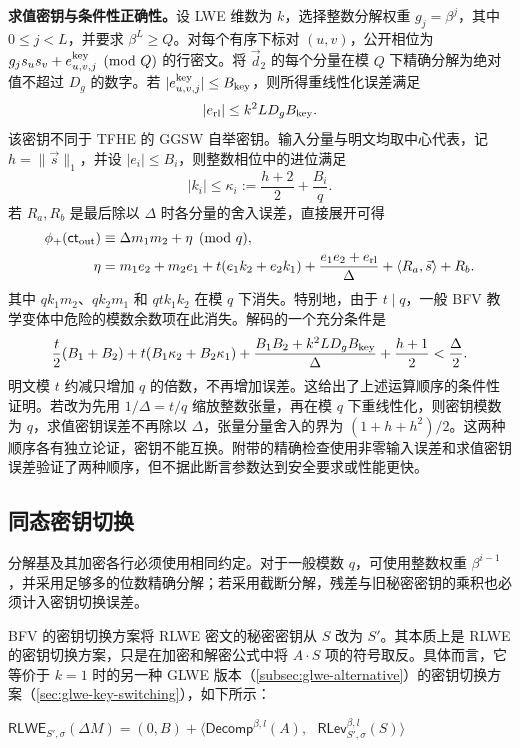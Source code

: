 \textbf{求值密钥与条件性正确性。}设 LWE 维数为 $k$，选择整数分解权重 $g_j=\beta^j$，其中 $0\leq j<L$，并要求 $\beta^L\geq Q$。对每个有序下标对 $(u,v)$，公开相位为 $g_js_us_v+e_{u,v,j}^{\rm key}\pmod Q$ 的行密文。将 $\vec d_2$ 的每个分量在模 $Q$ 下精确分解为绝对值不超过 $D_g$ 的数字。若 $|e_{u,v,j}^{\rm key}|\leq B_{\rm key}$，则所得重线性化误差满足
\[
|e_{\rm rl}|\leq k^2LD_gB_{\rm key}.
\]
该密钥不同于 TFHE 的 GGSW 自举密钥。输入分量与明文均取中心代表，记 $h=\|\vec s\|_1$，并设 $|e_i|\leq B_i$，则整数相位中的进位满足
\[
|k_i|\leq\kappa_i:=\frac{h+2}{2}+\frac{B_i}{q}.
\]
若 $R_a,R_b$ 是最后除以 $\Delta$ 时各分量的舍入误差，直接展开可得
\[
\begin{aligned}
\phi_+(\textsf{ct}_{\rm out})&\equiv\Delta m_1m_2+\eta\pmod q,\\
\eta&=m_1e_2+m_2e_1+t(e_1k_2+e_2k_1)
      +\frac{e_1e_2+e_{\rm rl}}\Delta
      +\langle R_a,\vec s\rangle+R_b.
\end{aligned}
\]
其中 $qk_1m_2$、$qk_2m_1$ 和 $qt k_1k_2$ 在模 $q$ 下消失。特别地，由于 $t\mid q$，一般 BFV 教学变体中危险的模数余数项在此消失。解码的一个充分条件是
\[
\frac t2(B_1+B_2)+t(B_1\kappa_2+B_2\kappa_1)
+\frac{B_1B_2+k^2LD_gB_{\rm key}}\Delta+\frac{h+1}{2}
<\frac\Delta2.
\]
明文模 $t$ 约减只增加 $q$ 的倍数，不再增加误差。这给出了上述运算顺序的条件性证明。若改为先用 $1/\Delta=t/q$ 缩放整数张量，再在模 $q$ 下重线性化，则密钥模数为 $q$，求值密钥误差不再除以 $\Delta$，张量分量舍入的界为 $(1+h+h^2)/2$。这两种顺序各有独立论证，密钥不能互换。附带的精确检查使用非零输入误差和求值密钥误差验证了两种顺序，但不据此断言参数达到安全要求或性能更快。

\subsection{同态密钥切换}
\label{subsec:bfv-key-switching}

分解基及其加密各行必须使用相同约定。对于一般模数 $q$，可使用整数权重 $\beta^{i-1}$，并采用足够多的位数精确分解；若采用截断分解，残差与旧秘密密钥的乘积也必须计入密钥切换误差。

BFV 的密钥切换方案将 RLWE 密文的秘密密钥从 $S$ 改为 $S'$。其本质上是 RLWE 的密钥切换方案，只是在加密和解密公式中将 $A\cdot S$ 项的符号取反。具体而言，它等价于 $k = 1$ 时的另一种 GLWE 版本（\autoref{subsec:glwe-alternative}）的密钥切换方案（\autoref{sec:glwe-key-switching}），如下所示：

\begin{tcolorbox}[title={\textbf{\tboxlabel{\ref*{subsec:bfv-key-switching}} BFV 的密钥切换}}]
$\textsf{RLWE}_{S',\sigma}(\Delta M) = (0, B) + \bm{\langle} \textsf{Decomp}^{\beta, l}(A), \text{ } \textsf{RLev}_{S', \sigma}^{\beta, l}(S) \bm{\rangle}$
\end{tcolorbox}




